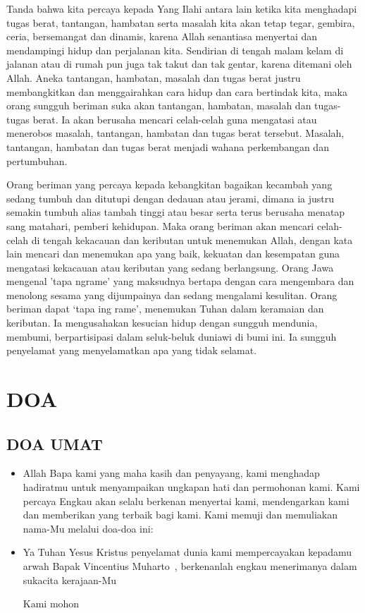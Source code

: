 \documentclass[a5paper,headsepline,titlepage,11pt,nnormalheadings,DIVcalc]{scrbook}
\newcommand{\BP}[1]{\begin{itemize} \item[P:] #1 \end{itemize}}
\newcommand{\namaalm}{Bapak Vincentius Muharto~}
\begin{document}
Tanda bahwa kita percaya kepada Yang Ilahi antara lain ketika kita menghadapi tugas berat, tantangan, hambatan serta masalah kita akan tetap tegar, gembira, ceria, bersemangat dan dinamis, karena Allah senantiasa menyertai dan mendampingi hidup dan perjalanan kita. Sendirian di tengah malam kelam di jalanan atau di rumah pun juga tak takut dan tak gentar, karena ditemani oleh Allah. Aneka tantangan, hambatan, masalah dan tugas berat justru membangkitkan dan menggairahkan cara hidup dan cara bertindak kita, maka orang sungguh beriman suka akan tantangan, hambatan, masalah dan tugas-tugas berat. Ia akan berusaha mencari celah-celah guna mengatasi atau menerobos masalah, tantangan, hambatan dan tugas berat tersebut. Masalah, tantangan, hambatan dan tugas berat menjadi wahana perkembangan dan pertumbuhan.

Orang beriman yang percaya kepada kebangkitan bagaikan kecambah yang sedang tumbuh dan ditutupi dengan dedauan atau jerami, dimana ia justru semakin tumbuh alias tambah tinggi atau besar serta terus berusaha menatap sang matahari, pemberi kehidupan. Maka orang beriman akan mencari celah-celah di tengah kekacauan dan keributan untuk menemukan Allah, dengan kata lain mencari dan menemukan apa yang baik, kekuatan dan kesempatan guna mengatasi kekacauan atau keributan yang sedang berlangsung. Orang Jawa mengenal 'tapa ngrame' yang maksudnya bertapa dengan cara mengembara dan menolong sesama yang dijumpainya dan sedang mengalami kesulitan. Orang beriman dapat ‘tapa ing rame’, menemukan Tuhan dalam keramaian dan keributan. Ia mengusahakan kesucian hidup dengan sungguh mendunia, membumi, berpartisipasi dalam seluk-beluk duniawi di bumi ini. Ia sungguh penyelamat yang menyelamatkan apa yang tidak selamat.

\section*{DOA}

\subsection*{DOA UMAT}

\BP{Allah Bapa kami yang maha kasih dan penyayang, kami menghadap hadiratmu untuk menyampaikan ungkapan hati dan permohonan kami. Kami percaya Engkau akan selalu berkenan menyertai kami, mendengarkan kami dan memberikan yang terbaik bagi kami. Kami memuji dan memuliakan nama-Mu melalui doa-doa ini:}

\BP{Ya Tuhan Yesus Kristus penyelamat dunia kami mempercayakan kepadamu arwah \namaalm, berkenanlah engkau menerimanya dalam sukacita kerajaan-Mu

Kami mohon}
\end{document}
